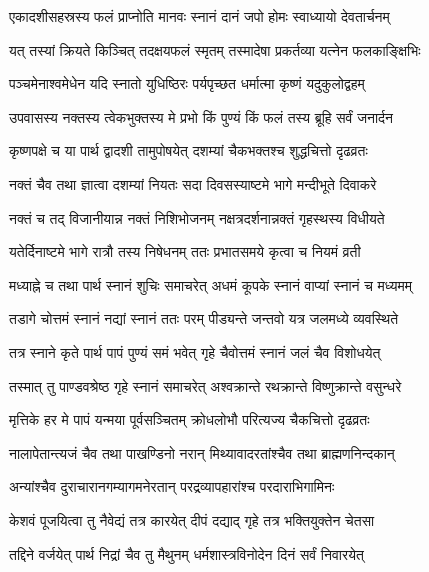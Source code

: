\twolineshloka
{एकादशीसहस्रस्य फलं प्राप्नोति मानवः}
{स्नानं दानं जपो होमः स्वाध्यायो देवतार्चनम्}%

\twolineshloka
{यत् तस्यां क्रियते किञ्चित् तदक्षयफलं स्मृतम्}
{तस्मादेषा प्रकर्तव्या यत्नेन फलकाङ्क्षिभिः}%

\twolineshloka
{पञ्चमेनाश्वमेधेन यदि स्नातो युधिष्ठिरः}
{पर्यपृच्छत धर्मात्मा कृष्णं यदुकुलोद्वहम्}%


\twolineshloka
{उपवासस्य नक्तस्य त्वेकभुक्तस्य मे प्रभो}
{किं पुण्यं किं फलं तस्य ब्रूहि सर्वं जनार्दन}%


\twolineshloka
{कृष्णपक्षे च या पार्थ द्वादशी तामुपोषयेत्}
{दशम्यां चैकभक्तश्च शुद्धचित्तो दृढव्रतः}%

\twolineshloka
{नक्तं चैव तथा ज्ञात्वा दशम्यां नियतः सदा}
{दिवसस्याष्टमे भागे मन्दीभूते दिवाकरे}%

\twolineshloka
{नक्तं च तद् विजानीयान्न नक्तं निशिभोजनम्}
{नक्षत्रदर्शनान्नक्तं गृहस्थस्य विधीयते}%

\twolineshloka
{यतेर्दिनाष्टमे भागे रात्रौ तस्य निषेधनम्}
{ततः प्रभातसमये कृत्वा च नियमं व्रती}%

\twolineshloka
{मध्याह्ने च तथा पार्थ स्नानं शुचिः समाचरेत्}
{अधमं कूपके स्नानं वाप्यां स्नानं च मध्यमम्}%

\twolineshloka
{तडागे चोत्तमं स्नानं नद्यां स्नानं ततः परम्}
{पीड्यन्ते जन्तवो यत्र जलमध्ये व्यवस्थिते}%

\twolineshloka
{तत्र स्नाने कृते पार्थ पापं पुण्यं समं भवेत्}
{गृहे चैवोत्तमं स्नानं जलं चैव विशोधयेत्}%

\twolineshloka
{तस्मात् तु पाण्डवश्रेष्ठ गृहे स्नानं समाचरेत्}
{अश्वक्रान्ते रथक्रान्ते विष्णुक्रान्ते वसुन्धरे}%

\twolineshloka
{मृत्तिके हर मे पापं यन्मया पूर्वसञ्चितम्}
{क्रोधलोभौ परित्यज्य चैकचित्तो दृढव्रतः}%

\twolineshloka
{नालापेतान्त्यजं चैव तथा पाखण्डिनो नरान्}
{मिथ्यावादरतांश्चैव तथा ब्राह्मणनिन्दकान्}%

\twolineshloka
{अन्यांश्चैव दुराचारानगम्यागमनेरतान्}
{परद्रव्यापहारांश्च परदाराभिगामिनः}%

\twolineshloka
{केशवं पूजयित्वा तु नैवेद्यं तत्र कारयेत्}
{दीपं दद्याद् गृहे तत्र भक्तियुक्तेन चेतसा}%

\twolineshloka
{तद्दिने वर्जयेत् पार्थ निद्रां चैव तु मैथुनम्}
{धर्मशास्त्रविनोदेन दिनं सर्वं निवारयेत्}%


